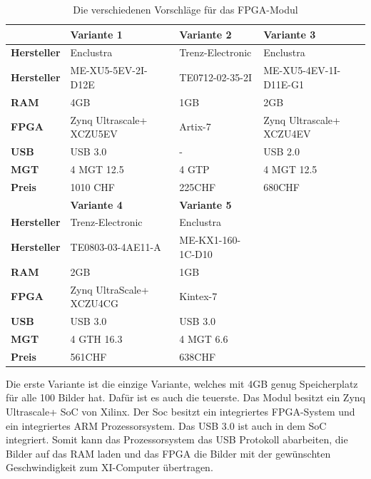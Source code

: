 \documentclass{article}
\begin{document}
\begin{table}[tb]
    \caption{Die verschiedenen Vorschläge für das FPGA-Modul}
    \begin{tabular}{|l|l|l|l|}
        \hline
        & \textbf{Variante 1} & \textbf{Variante 2} & \textbf{Variante 3} \\ \hline

        \textbf{Hersteller} & Enclustra & Trenz-Electronic & Enclustra \\ \hline
        \textbf{Hersteller} & ME-XU5-5EV-2I-D12E & TE0712-02-35-2I & ME-XU5-4EV-1I-D11E-G1 \\ \hline
        \textbf{RAM} & 4GB & 1GB & 2GB \\ \hline
        \textbf{FPGA} & Zynq Ultrascale+ XCZU5EV & Artix-7 & Zynq Ultrascale+ XCZU4EV \\ \hline
        \textbf{USB} & USB 3.0 & - & USB 2.0 \\ \hline
        \textbf{MGT} & 4 MGT 12.5 & 4 GTP & 4 MGT 12.5  \\ \hline
        \textbf{Preis} & 1010 CHF & 225CHF & 680CHF \\ \hline

        \hline
        & \textbf{Variante 4} & \textbf{Variante 5} & \\ \hline
        \textbf{Hersteller} & Trenz-Electronic & Enclustra & \\ \hline
        \textbf{Hersteller} & TE0803-03-4AE11-A & ME-KX1-160-1C-D10 & \\ \hline
        \textbf{RAM} & 2GB & 1GB & \\ \hline
        \textbf{FPGA} & Zynq UltraScale+ XCZU4CG & Kintex-7 & \\ \hline
        \textbf{USB} & USB 3.0 & USB 3.0 & \\ \hline
        \textbf{MGT} & 4 GTH 16.3 & 4 MGT 6.6 & \\ \hline
        \textbf{Preis} & 561CHF & 638CHF & \\ \hline
    \end{tabular}

        
    \label{tab:modulVarianten}
    \end{table}

    Die erste Variante ist die einzige Variante, welches mit 4GB genug Speicherplatz für alle 100 Bilder hat. Dafür ist es auch die teuerste. Das Modul besitzt ein Zynq Ultrascale+ SoC von Xilinx. Der Soc besitzt ein integriertes FPGA-System und ein integriertes ARM Prozessorsystem. Das USB 3.0 ist auch in dem SoC integriert. Somit kann das Prozessorsystem das USB Protokoll abarbeiten, die Bilder auf das RAM laden und das FPGA die Bilder mit der gewünschten Geschwindigkeit zum XI-Computer übertragen.
    
\end{document}
